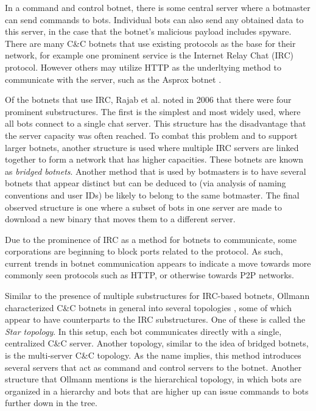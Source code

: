 \documentclass{acm_proc_article-sp}
\begin{document}
In a command and control botnet, there is some central server where a botmaster can send commands to bots. Individual bots can also send any obtained data to this server, in the case that the botnet's malicious payload includes spyware. There are many C\&C botnets that use existing protocols as the base for their network, for example one prominent service is the Internet Relay Chat (IRC) protocol. However others may utilize HTTP as the underltying method to communicate with the server, such as the Asprox botnet \cite{borgaonkar:analysis}. 

Of the botnets that use IRC, Rajab et al. noted in 2006  \cite{rajab:botnets} that there were four prominent substructures. The first is the simplest and most widely used, where all bots connect to a single chat server. This structure has the disadvantage that the server capacity was often reached. To combat this problem and to support larger botnets, another structure is used where multiple IRC servers are linked together to form a network that has higher capacities. These botnets are known as \emph{bridged botnets}. Another method that is used by botmasters is to have several botnets that appear distinct but can be deduced to (via analysis of naming conventions and user IDs) be likely to belong to the same botmaster. The final observed structure is one where a subset of bots in one server are made to download a new binary that moves them to a different server.

Due to the prominence of IRC as a method for botnets to communicate, some corporations are beginning to block ports related to the protocol. As such, current trends in botnet communication appears to indicate a move towards more commonly seen protocols such as HTTP, or otherwise towards P2P networks.

Similar to the presence of multiple substructures for IRC-based botnets, Ollmann characterized C\&C botnets in general into several topologies \cite{ollmann:topology}, some of which appear to have counterparts to the IRC substructures. One of these is called the \emph{Star topology}. In this setup, each bot communicates directly with a single, centralized C\&C server. Another topology, similar to the idea of bridged botnets, is the multi-server C\&C topology. As the name implies, this method introduces several servers that act as command and control servers to the botnet. Another structure that Ollmann mentions is the hierarchical topology, in which bots are organized in a hierarchy and bots that are higher up can issue commands to bots further down in the tree.
\end{document}
